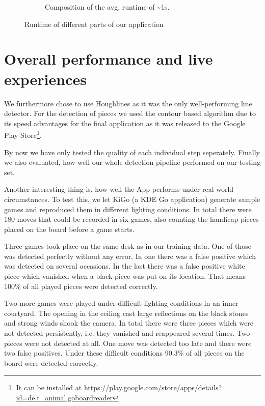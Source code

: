 \begin{figure}
\begin{subfigure}{0.25\textwidth}
\begin{tikzpicture}
			\end{tikzpicture}
			\vspace{1.5em}
			\caption{Composition of the avg. runtime of \textasciitilde1s.}
			\label{fig:timeEvaluation-pie}
		\end{subfigure}

		\caption{Runtime of different parts of our application}
		\label{fig:timeEvaluation}
	\end{figure}




	\section{Overall performance and live experiences}
	\label{evaluation-overallPerformance}
	We furthermore chose to use Houghlines as it was the only well-performing line detector. For the detection of pieces we used the contour based algorithm due to its speed advantages for the final application as it was released to the Google Play Store\footnote{It can be installed at \url{https://play.google.com/store/apps/details?id=de.t_animal.goboardreader}}.

	By now we have only tested the quality of each individual step seperately. Finally we also evaluated, how well our whole detection pipeline performed on our testing set.

	Another interesting thing is, how well the App performs under real world circumstances. To test this, we let KiGo (a KDE Go application) generate sample games and reproduced them in different lighting conditions. In total there were 180 moves that could be recorded in six games, also counting the handicap pieces placed on the board before a game starts.

	Three games took place on the same desk as in our training data. One of those was detected perfectly without any error. In one there was a false positive which was detected on several occasions. In the last there was a false positive white piece which vanished when a black piece was put on its location. That means 100\% of all played pieces were detected correctly.

	Two more games were played under difficult lighting conditions in an inner courtyard. The opening in the ceiling cast large reflections on the black stones and strong winds shook the camera. In total there were three pieces which were not detected persistently, i.e. they vanished and reappeared several times. Two pieces were not detected at all. One move was detected too late and there were two false positives. Under these difficult conditions 90.3\% of all pieces on the board were detected correctly.

